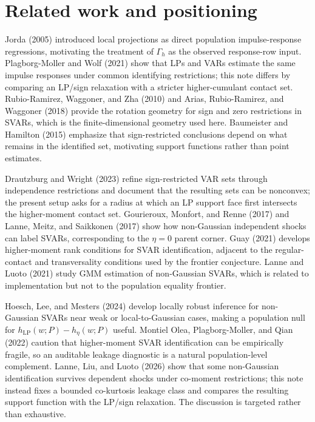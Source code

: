 \documentclass[11pt]{article}
\theoremstyle{definition}
\theoremstyle{plain}
\theoremstyle{remark}
\begin{document}
\section{Related work and positioning}
Jorda (2005) introduced local projections as direct population impulse-response regressions, motivating the treatment of \(\Gamma_h\) as the observed response-row input.  Plagborg-Moller and Wolf (2021) show that LPs and VARs estimate the same impulse responses under common identifying restrictions; this note differs by comparing an LP/sign relaxation with a stricter higher-cumulant contact set.  Rubio-Ramirez, Waggoner, and Zha (2010) and Arias, Rubio-Ramirez, and Waggoner (2018) provide the rotation geometry for sign and zero restrictions in SVARs, which is the finite-dimensional geometry used here.  Baumeister and Hamilton (2015) emphasize that sign-restricted conclusions depend on what remains in the identified set, motivating support functions rather than point estimates.

Drautzburg and Wright (2023) refine sign-restricted VAR sets through independence restrictions and document that the resulting sets can be nonconvex; the present setup asks for a radius at which an LP support face first intersects the higher-moment contact set.  Gourieroux, Monfort, and Renne (2017) and Lanne, Meitz, and Saikkonen (2017) show how non-Gaussian independent shocks can label SVARs, corresponding to the \(\eta=0\) parent corner.  Guay (2021) develops higher-moment rank conditions for SVAR identification, adjacent to the regular-contact and transversality conditions used by the frontier conjecture.  Lanne and Luoto (2021) study GMM estimation of non-Gaussian SVARs, which is related to implementation but not to the population equality frontier.

Hoesch, Lee, and Mesters (2024) develop locally robust inference for non-Gaussian SVARs near weak or local-to-Gaussian cases, making a population null for \(h_{\mathrm{LP}}(w;P)-h_\eta(w;P)\) useful.  Montiel Olea, Plagborg-Moller, and Qian (2022) caution that higher-moment SVAR identification can be empirically fragile, so an auditable leakage diagnostic is a natural population-level complement.  Lanne, Liu, and Luoto (2026) show that some non-Gaussian identification survives dependent shocks under co-moment restrictions; this note instead fixes a bounded co-kurtosis leakage class and compares the resulting support function with the LP/sign relaxation.  The discussion is targeted rather than exhaustive.
\end{document}
